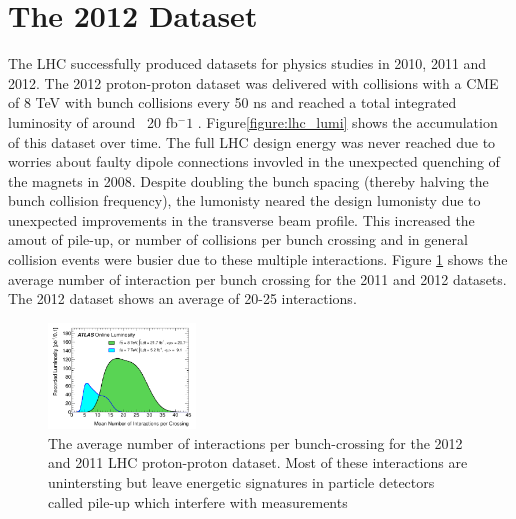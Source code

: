 \section{The 2012 Dataset} 

The LHC successfully produced datasets for physics studies in 2010, 2011 and 2012. The 2012 
proton-proton dataset was delivered with collisions with a CME of 8 TeV with bunch collisions
every 50 ns and reached a total integrated luminosity of around ~20 fb$^-1$ \cite{Aad:2013ucp}.
Figure\ref{figure:lhc_lumi} shows the accumulation of this dataset over time. 
The full LHC design energy was never reached due to worries about faulty dipole
connections invovled in the unexpected quenching of the magnets in 2008. Despite doubling
the bunch spacing (thereby halving the bunch collision frequency), the lumonisty neared
the design lumonisty due to unexpected improvements in the transverse beam profile\cite{Carli:1424362}. This increased
the amout of pile-up, or number of collisions per bunch crossing and in general collision
events were busier due to these multiple interactions\cite{}. Figure \ref{figure:lhc_pileup} shows
the average number of interaction per bunch crossing for the 2011 and 2012 datasets. The 2012
dataset shows an average of 20-25 interactions. 

\begin{figure}[!t]
\centering 
\includegraphics[width=0.35\textwidth]{figs/mu_2011_2012-dec.pdf}
\caption{ The average number of interactions per bunch-crossing for the 2012 and 2011 LHC proton-proton dataset. Most of these interactions are unintersting but leave energetic signatures in particle detectors called pile-up which interfere with measurements}\label{figure:lhc_pileup}
\end{figure} 


